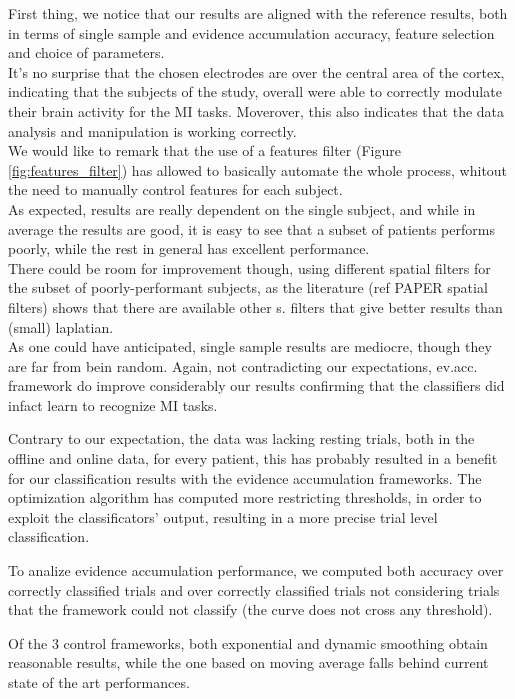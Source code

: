 First thing, we notice that our results are aligned with the reference results, both in terms of single sample and evidence accumulation accuracy, feature selection and choice of parameters. \\
It's no surprise that the chosen electrodes are over the central area of the cortex, indicating that the subjects of the study, overall were able to correctly modulate their brain activity for the MI tasks. Moverover, this also indicates that the data analysis and manipulation is working correctly.\\
We would like to remark that the use of a features filter (Figure \ref{fig:features_filter}) has allowed to basically automate the whole process, whitout the need to manually control features for each subject. \\

As expected, results are really dependent on the single subject, and while in average the results are good, it is easy to see that a subset of patients performs poorly, while the rest in general has excellent performance. \\
There could be room for improvement though, using different spatial filters for the subset of poorly-performant subjects, as the literature (ref PAPER spatial filters) shows that there are available other s. filters that give better results than (small) laplatian. \\

As one could have anticipated, single sample results are mediocre, though they are far from bein random. 
Again, not contradicting our expectations, ev.acc. framework do improve considerably our results confirming that the classifiers did infact learn to recognize MI tasks.

Contrary to our expectation, the data was lacking resting trials, both in the offline and online data, for every patient, this has probably resulted in a benefit for our classification results with the evidence accumulation frameworks. The optimization algorithm has computed more restricting thresholds, in order to exploit the classificators' output, resulting in a more precise trial level classification.

To analize evidence accumulation performance, we computed both accuracy over correctly classified trials and over correctly classified trials not considering trials that the framework could not classify (the curve does not cross any threshold).

Of the 3 control frameworks, both exponential and dynamic smoothing obtain reasonable results, while the one based on moving average falls behind current state of the art performances.

